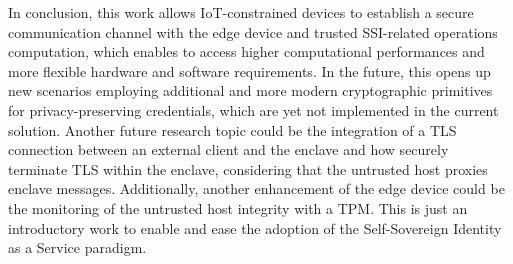 
In conclusion, this work allows IoT-constrained devices to establish a secure communication channel with the edge device and trusted SSI-related operations computation, which enables to access higher computational performances and more flexible hardware and software requirements. In the future, this opens up new scenarios employing additional and more modern cryptographic primitives for privacy-preserving credentials, which are yet not implemented in the current solution. 
Another future research topic could be the integration of a TLS connection between an external client and the enclave and how securely terminate TLS within the enclave, considering that the untrusted host proxies enclave messages. 
Additionally, another enhancement of the edge device could be the monitoring of the untrusted host integrity with a TPM.
This is just an introductory work to enable and ease the adoption of the Self-Sovereign Identity as a Service paradigm.